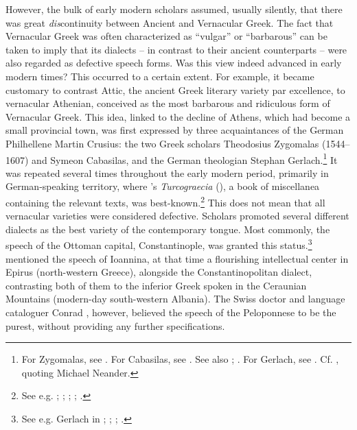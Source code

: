 However, the bulk of early modern scholars assumed, usually silently, that there was great \textit{dis}continuity between Ancient and Vernacular Greek. The fact that Vernacular Greek was often characterized as “vulgar” or “barbarous” can be taken to imply that its dialects – in contrast to their ancient counterparts – were also regarded as defective speech forms. Was this view indeed advanced in early modern times? This occurred to a certain extent. For example, it became customary to contrast Attic, the ancient Greek literary variety par excellence, to vernacular Athenian, conceived as the most barbarous and ridiculous form of Vernacular Greek. This idea, linked to the decline of Athens, which had become a small provincial town, was first expressed by three acquaintances of the German Philhellene Martin Crusius: the two Greek scholars Theodosius Zygomalas (1544–1607) and Symeon Cabasilas, and the German theologian Stephan Gerlach.\footnote{For Zygomalas, see \citet[99, 216]{Crusius1584}. For Cabasilas, see \citet[461]{Crusius1584}. See also \citet[91]{Rotolo1973}; \citet[185, 189–190]{Rhoby2002}. For Gerlach, see \citet[489]{Crusius1584}. Cf. \citet[194]{Ben-tov2013}, quoting Michael Neander.} It was repeated several times throughout the early modern period, primarily in German-speaking territory, where ’s \textit{Turcograecia} (\citeyear{Crusius1584}), a book of miscellanea containing the relevant texts, was best-known.\footnote{See e.g. \citet[215]{Becman1673}; \citet[\textsc{a.3}\textsc{\textsuperscript{v}}]{Rodigast1685}; \citet[\textsc{ii}.824]{Hofmann1698}; \citet[1135]{[frisch]1730}; \citet[9]{Gedike1782}.} This does not mean that all vernacular varieties were considered defective. Scholars promoted several different dialects as the best variety of the contemporary tongue. Most commonly, the speech of the Ottoman capital, Constantinople, was granted this status.\footnote{See e.g. Gerlach in \citet[489]{Crusius1584}; \citet[215]{Becman1673}; \citet[74]{Blount1680}; \citet[vii]{Du1688}.} \citet[a.4\textsc{\textsuperscript{v}}, a.7\textsc{\textsuperscript{r}}]{Tribbechow1705} mentioned the speech of Ioannina, at that time a flourishing intellectual center in Epirus (north-western Greece), alongside the Constantinopolitan dialect, contrasting both of them to the inferior Greek spoken in the Ceraunian Mountains (modern-day south-western Albania). The Swiss doctor and language cataloguer Conrad \citet[47\textsc{\textsuperscript{r}}]{Gessner1555}, however, believed the speech of the Peloponnese to be the purest, without providing any further specifications.

